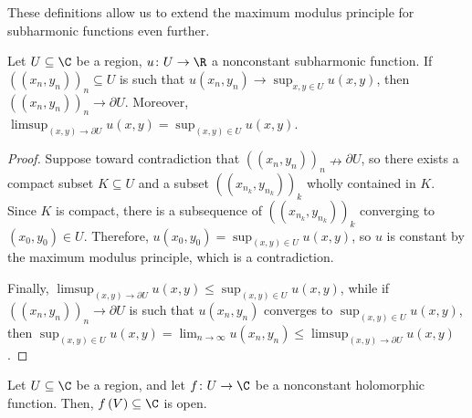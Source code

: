 \documentclass[10pt]{mypackage}
\begin{document}
These definitions allow us to extend the maximum modulus principle for subharmonic functions even further.
\begin{theorem}
  Let $U\subseteq \C$ be a region, $u\colon U\rightarrow \R$ a nonconstant subharmonic function. If $\left( \left( x_n,y_n \right) \right)_n\subseteq U$ is such that $u\left( x_n,y_n \right)\rightarrow \sup_{x,y\in U}u\left( x,y \right)$, then $\left( \left( x_n,y_n \right) \right)_n\rightarrow \partial U$. Moreover, $\limsup_{\left( x,y \right)\rightarrow \partial U}u\left( x,y \right) = \sup_{\left( x,y \right)\in U} u\left( x,y \right)$.
\end{theorem}
\begin{proof}
  Suppose toward contradiction that $\left( \left( x_n,y_n \right) \right)_n\nrightarrow \partial U$, so there exists a compact subset $K\subseteq U$ and a subset $\left( \left( x_{n_k},y_{n_k} \right) \right)_k$ wholly contained in $K$. Since $K$ is compact, there is a subsequence of $\left( \left( x_{n_k},y_{n_k} \right) \right)_k$ converging to $\left( x_0,y_0 \right)\in U$. Therefore, $u\left( x_0,y_0 \right) = \sup_{\left( x,y \right)\in U}u\left( x,y \right)$, so $u$ is constant by the maximum modulus principle, which is a contradiction.\newline

  Finally, $\limsup_{\left( x,y \right)\rightarrow \partial U}u\left( x,y \right)\leq \sup_{\left( x,y \right)\in U}u\left( x,y \right)$, while if $\left( \left( x_n,y_n \right) \right)_n\rightarrow \partial U$ is such that $u\left( x_n,y_n \right)$ converges to $\sup_{\left( x,y \right)\in U}u\left( x,y \right)$, then $\sup_{\left( x,y \right)\in U}u\left( x,y \right) = \lim_{n\rightarrow\infty}u\left( x_n,y_n \right) \leq \limsup_{\left( x,y \right)\rightarrow \partial U}u\left( x,y \right)$.
\end{proof}
\begin{theorem}
  Let $U\subseteq \C$ be a region, and let $f\colon U\rightarrow \C$ be a nonconstant holomorphic function. Then, $f\left( V \right)\subseteq \C$ is open.
\end{theorem}
\end{document}
